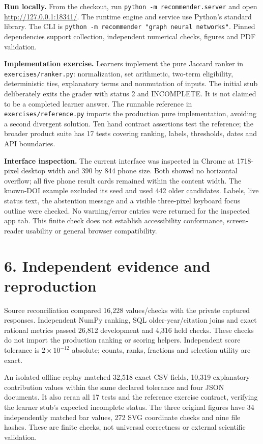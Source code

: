 \documentclass[10pt,letterpaper]{article}
\begin{document}
\textbf{Run locally.} From the checkout, run \texttt{python -m recommender.server} and open \url{http://127.0.0.1:18341/}. The runtime engine and service use Python's standard library. The CLI is \texttt{python -m recommender "graph neural networks"}. Pinned dependencies support collection, independent numerical checks, figures and PDF validation.

\textbf{Implementation exercise.} Learners implement the pure Jaccard ranker in \texttt{exercises/ranker.py}: normalization, set arithmetic, two-term eligibility, deterministic ties, explanatory terms and nonmutation of inputs. The initial stub deliberately exits the grader with status 2 and INCOMPLETE. It is not claimed to be a completed learner answer. The runnable reference in \texttt{exercises/reference.py} imports the production pure implementation, avoiding a second divergent solution. Ten hand contract assertions test the reference; the broader product suite has 17 tests covering ranking, labels, thresholds, dates and API boundaries.

\textbf{Interface inspection.} The current interface was inspected in Chrome at 1718-pixel desktop width and 390 by 844 phone size. Both showed no horizontal overflow; all five phone result cards remained within the content width. The known-DOI example excluded its seed and used 442 older candidates. Labels, live status text, the abstention message and a visible three-pixel keyboard focus outline were checked. No warning/error entries were returned for the inspected app tab. This finite check does not establish accessibility conformance, screen-reader usability or general browser compatibility.

\section*{6. Independent evidence and reproduction}
Source reconciliation compared 16,228 values/checks with the private captured responses. Independent NumPy ranking, SQL older-year/citation joins and exact rational metrics passed 26,812 development and 4,316 held checks. These checks do not import the production ranking or scoring helpers. Independent score tolerance is $2\times10^{-12}$ absolute; counts, ranks, fractions and selection utility are exact.

An isolated offline replay matched 32,518 exact CSV fields, 10,319 explanatory contribution values within the same declared tolerance and four JSON documents. It also reran all 17 tests and the reference exercise contract, verifying the learner stub's expected incomplete status. The three original figures have 34 independently matched bar values, 272 SVG coordinate checks and nine file hashes. These are finite checks, not universal correctness or external scientific validation.
\end{document}
